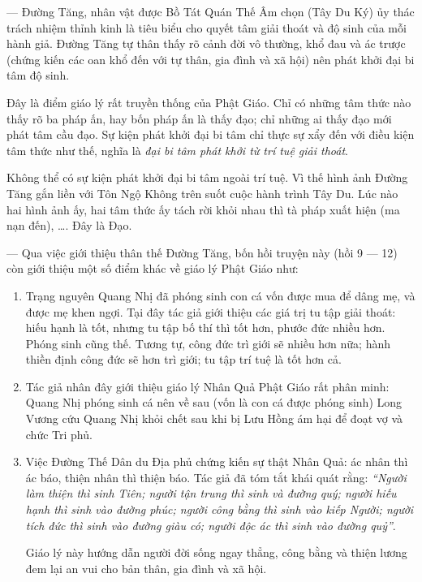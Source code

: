 — Đường Tăng, nhân vật được Bồ Tát Quán Thế Âm chọn (Tây Du Ký) ủy thác trách nhiệm thỉnh kinh là tiêu biểu cho quyết tâm giải thoát và độ sinh của mỗi hành giả. Đường Tăng tự thân thấy rõ cảnh đời vô thường, khổ đau và ác trược (chứng kiến các oan khổ đến với tự thân, gia đình và xã hội) nên phát khởi đại bi tâm độ sinh.

Đây là điểm giáo lý rất truyền thống của Phật Giáo. Chỉ có những tâm thức nào thấy rõ ba pháp ấn, hay bốn pháp ấn là thấy đạo; chỉ những ai thấy đạo mới phát tâm cầu đạo. Sự kiện phát khởi đại bi tâm chỉ thực sự xẩy đến với điều kiện tâm thức như thế, nghĩa là \emph{đại bi tâm phát khởi từ trí tuệ giải thoát}.

Không thể có sự kiện phát khởi đại bi tâm ngoài trí tuệ. Vì thế hình ảnh Đường Tăng gắn liền với Tôn Ngộ Không trên suốt cuộc hành trình Tây Du. Lúc nào hai hình ảnh ấy, hai tâm thức ấy tách rời khỏi nhau thì tà pháp xuất hiện (ma nạn đến), \ldots. Đây là Đạo.

— Qua việc giới thiệu thân thế Đường Tăng, bốn hồi truyện này (hồi 9 — 12) còn giới thiệu một số điểm khác về giáo lý Phật Giáo như:

\begin{enumerate}[label=\itshape\alph*\upshape/]

    \item Trạng nguyên Quang Nhị đã phóng sinh con cá vốn được mua để dâng mẹ, và được mẹ khen ngợi. Tại đây tác giả giới thiệu các giá trị tu tập giải thoát: hiếu hạnh là tốt, nhưng tu tập bố thí thì tốt hơn, phước đức nhiều hơn. Phóng sinh cũng thế. Tương tự, công đức trì giới sẽ nhiều hơn nữa; hành thiền định công đức sẽ hơn trì giới; tu tập trí tuệ là tốt hơn cả.

    \item Tác giả nhân đây giới thiệu giáo lý Nhân Quả Phật Giáo rất phân minh: Quang Nhị phóng sinh cá nên về sau (vốn là con cá được phóng sinh) Long Vương cứu Quang Nhị khỏi chết sau khi bị Lưu Hồng ám hại để đoạt vợ và chức Tri phủ.

    \item Việc Đường Thế Dân du Địa phủ chứng kiến sự thật Nhân Quả: ác nhân thì ác báo, thiện nhân thì thiện báo. Tác giả đã tóm tắt khái quát rằng: \emph{``Người làm thiện thì sinh Tiên; người tận trung thì sinh và đường quý; người hiếu hạnh thì sinh vào đường phúc; người công bằng thì sinh vào kiếp Người; người tích đức thì sinh vào đường giàu có; người độc ác thì sinh vào đường quỷ''}.

    Giáo lý này hướng dẫn người đời sống ngay thẳng, công bằng và thiện lương đem lại an vui cho bản thân, gia đình và xã hội.
\end{enumerate}


